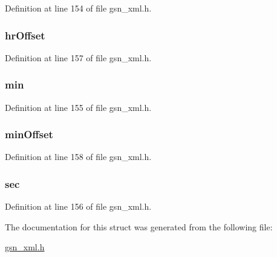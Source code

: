 Definition at line 154 of file gsn\_\-xml.h.

\hypertarget{a00437_aad11de9474bbeeed27b4986d738cf48e}{
\subsubsection[{hrOffset}]{ {\bf hrOffset}}}
\label{a00437_aad11de9474bbeeed27b4986d738cf48e}


Definition at line 157 of file gsn\_\-xml.h.

\hypertarget{a00437_afcd3b3e11f0b83ec71d50a827e42d9db}{
\subsubsection[{min}]{ {\bf min}}}
\label{a00437_afcd3b3e11f0b83ec71d50a827e42d9db}


Definition at line 155 of file gsn\_\-xml.h.

\hypertarget{a00437_ab33c78dee679b2e12fbc4a8f3ae4c933}{
\subsubsection[{minOffset}]{ {\bf minOffset}}}
\label{a00437_ab33c78dee679b2e12fbc4a8f3ae4c933}


Definition at line 158 of file gsn\_\-xml.h.

\hypertarget{a00437_a2edad25d34a288a33b77f09dfc71faa5}{
\subsubsection[{sec}]{ {\bf sec}}}
\label{a00437_a2edad25d34a288a33b77f09dfc71faa5}


Definition at line 156 of file gsn\_\-xml.h.



The documentation for this struct was generated from the following file:\begin{DoxyCompactItemize}
\item 
\hyperlink{a00616}{gsn\_\-xml.h}\end{DoxyCompactItemize}
